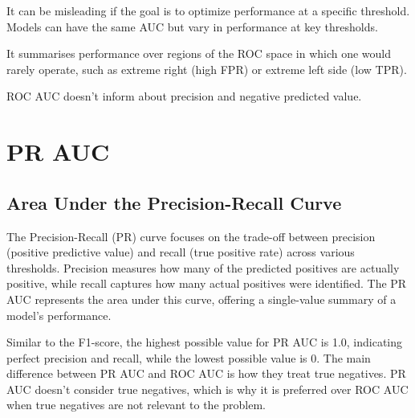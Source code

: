 \clearpage
{}
{
\item It can be misleading if the goal is to optimize performance at a specific threshold. Models can have the same AUC but vary in performance at key thresholds.
\item It summarises performance over regions of the ROC space in which one would rarely operate, such as extreme right (high FPR) or extreme left side (low TPR).
\item ROC AUC doesn't inform about precision and negative predicted value.
}

\clearpage
\thispagestyle{classificationstyle}
\section{PR AUC}
\subsection{Area Under the Precision-Recall Curve}

The Precision-Recall (PR) curve focuses on the trade-off between precision (positive predictive value) and recall (true positive rate) across various thresholds.
Precision measures how many of the predicted positives are actually positive, while recall captures how many actual positives were identified.
The PR AUC represents the area under this curve, offering a single-value summary of a model's performance.

\begin{center}
\end{center}

Similar to the F1-score, the highest possible value for PR AUC is 1.0, indicating perfect precision and recall, while the lowest possible value is 0.
The main difference between PR AUC and ROC AUC is how they treat true negatives. PR AUC doesn't consider true negatives, which is why it is preferred over ROC AUC
when true negatives are not relevant to the problem.

